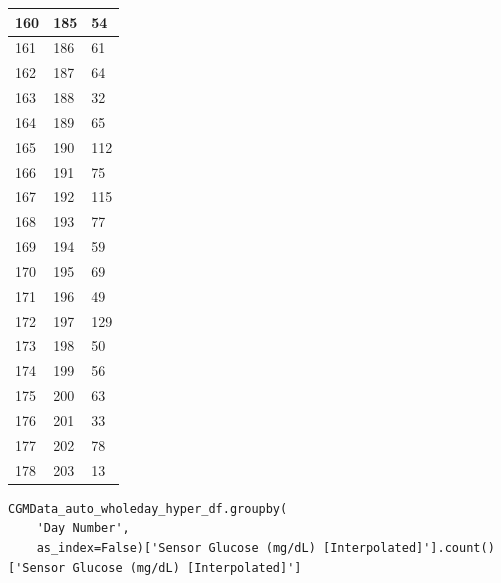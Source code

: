 \begin{tabular}{p{}p{}p{}}
\hline
160 & 185 & 54 \\
\hline
161 & 186 & 61 \\
\hline
162 & 187 & 64 \\
\hline
163 & 188 & 32 \\
\hline
164 & 189 & 65 \\
\hline
165 & 190 & 112 \\
\hline
166 & 191 & 75 \\
\hline
167 & 192 & 115 \\
\hline
168 & 193 & 77 \\
\hline
169 & 194 & 59 \\
\hline
170 & 195 & 69 \\
\hline
171 & 196 & 49 \\
\hline
172 & 197 & 129 \\
\hline
173 & 198 & 50 \\
\hline
174 & 199 & 56 \\
\hline
175 & 200 & 63 \\
\hline
176 & 201 & 33 \\
\hline
177 & 202 & 78 \\
\hline
178 & 203 & 13 \\
\hline
\bottomrule
\end{tabular}

\bigskip

\begin{verbatim}
CGMData_auto_wholeday_hyper_df.groupby(
    'Day Number', 
    as_index=False)['Sensor Glucose (mg/dL) [Interpolated]'].count()['Sensor Glucose (mg/dL) [Interpolated]']
\end{verbatim}


